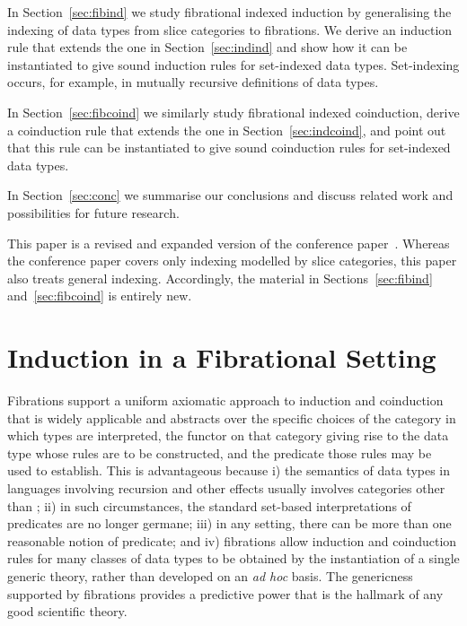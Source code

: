 \documentclass{LMCS}
\theoremstyle{plain}
\theoremstyle{remark}
\theoremstyle{definition}
\begin{document}
\begin{iteMize}{}
\item In Section~\ref{sec:fibind} we study fibrational indexed
  induction by generalising the indexing of data types from slice
  categories to fibrations. We derive an induction rule that extends
  the one in Section~\ref{sec:indind} and show how it can be
  instantiated to give sound induction rules for set-indexed data
  types. Set-indexing occurs, for example, in mutually recursive
  definitions of data types.

\item In Section~\ref{sec:fibcoind} we similarly study fibrational
  indexed coinduction, derive a coinduction rule that extends the one
  in Section~\ref{sec:indcoind}, and point out that this rule can be
  instantiated to give sound coinduction rules for set-indexed data
  types.

\item In Section~\ref{sec:conc} we summarise our conclusions and
  discuss related work and possibilities for future research.
\end{iteMize}

\noindent This paper is a revised and expanded version of the conference
paper~\cite{fgj11}. Whereas the conference paper covers only indexing
modelled by slice categories, this paper also treats general
indexing. Accordingly, the material in Sections~\ref{sec:fibind}
and~\ref{sec:fibcoind} is entirely new.


\section{Induction in a Fibrational Setting}\label{sec:ind}

Fibrations support a uniform axiomatic approach to induction and
coinduction that is widely applicable and abstracts over the specific
choices of the category in which types are interpreted, the functor on
that category giving rise to the data type whose rules are to be
constructed, and the predicate those rules may be used to establish.
This is advantageous because i) the semantics of data types in
languages involving recursion and other effects usually involves
categories other than ; ii) in such circumstances, the standard
set-based interpretations of predicates are no longer germane; iii) in
any setting, there can be more than one reasonable notion of
predicate; and iv) fibrations allow induction and coinduction rules
for many classes of data types to be obtained by the instantiation of
a single generic theory, rather than developed on an {\em ad hoc}
basis. The genericness supported by fibrations provides a predictive
power that is the hallmark of any good scientific theory.
\end{document}
